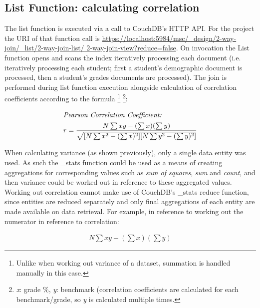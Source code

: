 

\subsection{List Function: calculating correlation}
The list function is executed via a call to CouchDB's HTTP API. For the project the URI of that function call is \url{https://localhost:5984/msc/\_design/2-way-join/\_list/2-way-join-list/ 2-way-join-view?reduce=false}. On invocation the List function opens and scans the index iteratively processing each document (i.e. iteratively processing each student; first a student's demographic document is processed, then a student's grades documents are processed). The join is performed during list function execution alongside calculation of correlation coefficients according to the formula \footnote{Unlike when working out variance of a dataset, summation is handled manually in this case.} \footnote{\textit{x}: grade \%, \textit{y}: benchmark (correlation coefficients are calculated for each benchmark/grade, so \textit{y} is calculated multiple times.}: \begin{spreadlines}{15pt}
  \begin{gather*}
    \intertext{\textit{Pearson Correlation Coefficient:}}
    r = \frac{N\sum{xy} - (\sum{x})(\sum{y})}{\sqrt{[N\sum{x^2} - (\sum{x})^2][N\sum{y^2} - (\sum{y})^2]}}
  \end{gather*}
\end{spreadlines}

When calculating variance (as shown previously), only a single data entity was used. As such the \_stats function could be used as a means of creating aggregations for corresponding values such as \textit{sum of squares}, \textit{sum} and \textit{count}, and then variance could be worked out in reference to these aggregated values. Working out correlation cannot make use of CouchDB's \_stats reduce function, since entities are reduced separately and only final aggregations of each entity are made available on data retrieval. For example, in reference to working out the numerator in reference to correlation: \begin{spreadlines}{15pt}
  \begin{gather*}
    N\sum{xy} - (\sum{x})(\sum{y})
  \end{gather*}
\end{spreadlines}

